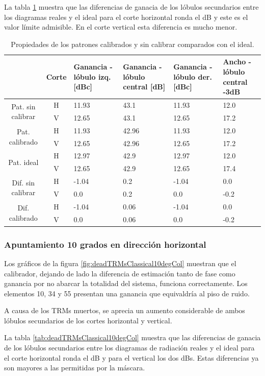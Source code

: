 La tabla \ref{tab:deadTRMsClassical0deg} muestra que las diferencias de ganacia de los lóbulos secundarios entre los diagramas 
reales y el ideal para el corte horizontal ronda el dB y  este es el valor límite admisible. En el corte vertical esta 
diferencia es mucho menor.

\begin{table}[H]
  \footnotesize
  \centering
  \begin{tabular}{|c|c|p{2cm}|p{2.5cm}|p{2.5cm}|p{2.5cm}|}
    \cline{2-6}
    \multicolumn{1}{c|}{} & Corte & Ganancia - lóbulo izq. [dBc] & Ganancia - lóbulo central [dB] &
    Ganancia - lóbulo der. [dBc] & Ancho - lóbulo central -3dB \tabularnewline\hline
    \multirow{2}{2cm}{Pat. sin calibrar} & H & 11.93 & 43.1 & 11.93 & 12.0 \tabularnewline\cline{2-6}
     & V & 12.65 & 43.1 & 12.65 & 17.2 \tabularnewline\hline
    \multirow{2}{2cm}{Pat. calibrado} & H & 11.93 & 42.96 & 11.93 & 12.0 \tabularnewline\cline{2-6}
     & V & 12.65 & 42.96 & 12.65 & 17.2 \tabularnewline\hline
    \multirow{2}{2cm}{Pat. ideal} & H & 12.97 & 42.9 & 12.97 & 12.0 \tabularnewline\cline{2-6}
     & V & 12.65 & 42.9 & 12.65 & 17.4 \tabularnewline\hline
    \multirow{2}{2cm}{Dif. sin calibrar} & H & -1.04 & 0.2 & -1.04 & 0.0\tabularnewline\cline{2-6}
     & V & 0.0 & 0.2 & 0.0 & -0.2 \tabularnewline\hline
    \multirow{2}{2cm}{Dif. calibrado} & H & -1.04 & 0.06 & -1.04 & 0.0 \tabularnewline\cline{2-6}
     & V & 0.0 & 0.06 & 0.0 & -0.2 \tabularnewline\hline
  \end{tabular}
  \caption{Propiedades de los patrones calibrados y sin calibrar comparados con el ideal.}
  \label{tab:deadTRMsClassical0deg}
\end{table}


\subsubsection{Apuntamiento 10 grados en dirección horizontal}

Los gráficos de la figura \ref{fig:deadTRMsClassical10degCol} muestran que el calibrador, dejando de lado la diferencia de 
estimación tanto de fase como ganancia por no abarcar la totalidad del sistema, funciona correctamente. Los elementos 10, 34 y 
55 presentan una ganancia que equivaldría al piso de ruido.

A causa de los TRMs muertos, se aprecia un aumento considerable de ambos lóbulos secundarios de los cortes horizontal y vertical.

La tabla \ref{tab:deadTRMsClassical10degCol} muestra que las diferencias de ganacia de los lóbulos secundarios entre los 
diagramas de radiación reales y el ideal para el corte horizontal ronda el dB y para el vertical los dos dBs. Estas diferencias
ya son mayores a las permitidas por la máscara.

